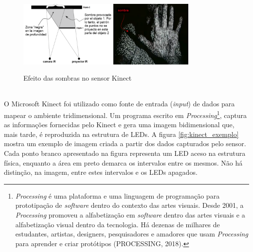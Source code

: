 \begin{figure}[H]
    \centering
    \caption{Efeito das sombras no sensor Kinect}
	\vspace*{0,2cm}
    \includegraphics[width=0.8\textwidth]{./04-figuras/kinect_sombras}
    \label{fig:kinect_sombras}
\end{figure}
\vspace*{-0,9cm}
{\raggedright {}}\\


O Microsoft Kinect foi utilizado como fonte de entrada (\textit{input}) de dados para mapear o ambiente tridimensional. Um programa escrito em \textit{Processing}\footnote{\textit{Processing} é uma plataforma e uma linguagem de programação para prototipação de \textit{software} dentro do contexto das artes visuais. Desde 2001, a \textit{Processing} promoveu a alfabetização em \textit{software} dentro das artes visuais e a alfabetização visual dentro da tecnologia. Há dezenas de milhares de estudantes, artistas, designers, pesquisadores e amadores que usam \textit{Processing} para aprender e criar protótipos (PROCESSING, 2018).}, captura as informações fornecidas pelo Kinect e gera uma imagem bidimensional que, mais tarde, é reproduzida na estrutura de LEDs. A figura \ref{fig:kinect_exemplo} mostra um exemplo de imagem criada a partir dos dados capturados pelo sensor. Cada ponto branco apresentado na figura representa um LED aceso na estrutura física, enquanto a área em preto demarca os intervalos entre os mesmos. Não há distinção, na imagem, entre estes intervalos e os LEDs apagados. 

